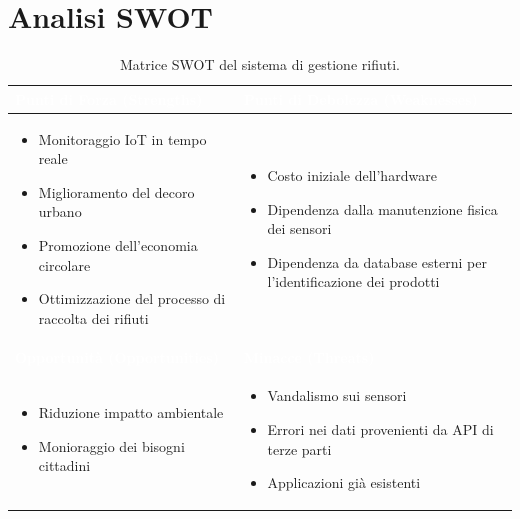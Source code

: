 \documentclass[12pt,a4paper]{article}
\begin{document}
\section{Analisi SWOT}

\begin{table}[H]
\centering
\begin{tabular}{|p{7cm}|p{7cm}|}
\hline
\cellcolor[HTML]{33a139} \textcolor{white}{\textbf{Punti di Forza (Strengths)}} & \cellcolor[HTML]{5196d6}\textcolor{white}{\textbf{Punti di Debolezza (Weaknesses)}} \\ \hline
\begin{itemize}
    \item Monitoraggio IoT in tempo reale
    \item Miglioramento del decoro urbano
    \item Promozione dell'economia circolare
    \item Ottimizzazione del processo di raccolta dei rifiuti
\end{itemize}

 & 

\begin{itemize}
    \item Costo iniziale dell'hardware
    \item Dipendenza dalla manutenzione fisica dei sensori
    \item Dipendenza da database esterni per l'identificazione dei prodotti

\end{itemize}  \\ \hline

\cellcolor[HTML]{7948ab}\textcolor{white}{\textbf{Opportunità (Opportunities)}} 

& 

\cellcolor[HTML]{d68258}\textcolor{white}{\textbf{Minacce (Threats)}} \\ \hline

\begin{itemize}
    \item Riduzione impatto ambientale
    \item Monioraggio dei bisogni cittadini
\end{itemize}
& 

\begin{itemize}
    \item Vandalismo sui sensori
    \item Errori nei dati provenienti da API di terze parti 
    \item Applicazioni già esistenti 
\end{itemize}
\\ \hline
\end{tabular}
\caption{Matrice SWOT del sistema di gestione rifiuti.}
\end{table}
\end{document}
